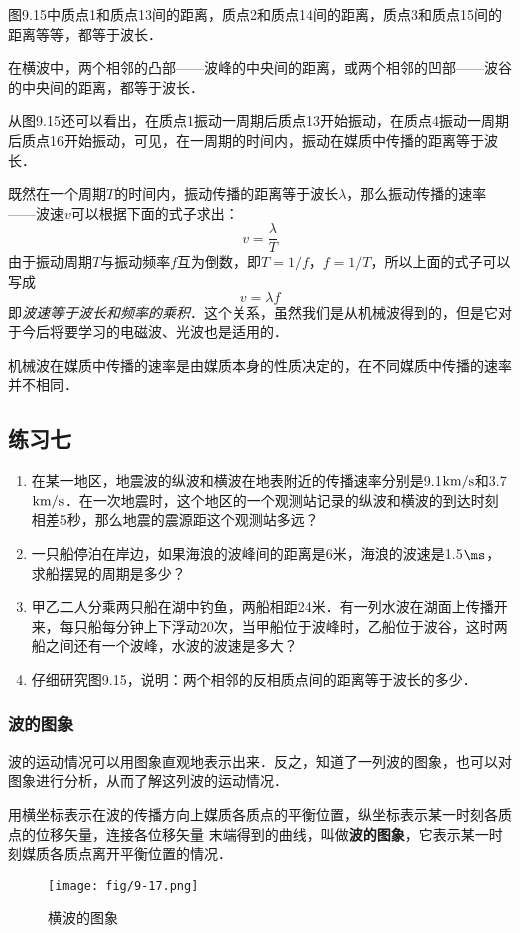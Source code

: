 图9.15中质点1和质点13间的距离，质点2和质点14间的距离，质点3和质点15间的距离等等，都等于波长．

在横波中，两个相邻的凸部——波峰的中央间的距离，或两个相邻的凹部——波谷的中央间的距离，都等于波长．

从图9.15还可以看出，在质点1振动一周期后质点13开始振动，在质点4振动一周期后质点16开始振动，可见，在一周期的时间内，振动在媒质中传播的距离等于波长．

既然在一个周期$T$的时间内，振动传播的距离等于波长$\lambda$，那么振动传播的速率——波速$v$可以根据下面的式子求出：
\[v=\frac{\lambda}{T}\]
由于振动周期$T$与振动频率$f$互为倒数，即$T=1/f$，$f=1/T$，所以上面的式子可以写成
\[v=\lambda f\]
即\textit{波速等于波长和频率的乘积}．这个关系，虽然我们是从机械波得到的，但是它对于今后将要学习的电磁波、光波也是适用的．

机械波在媒质中传播的速率是由媒质本身的性质决定的，在不同媒质中传播的速率并不相同．

\subsection*{练习七}
\begin{enumerate}
    \item 在某一地区，地震波的纵波和横波在地表附近的传播速率分别是9.1${\rm km}/{\rm s}$和3.7${\rm km}/{\rm s}$．在一次地震时，这个地区的一个观测站记录的纵波和横波的到达时刻相差5秒，那么地震的震源距这个观测站多远？
    \item 一只船停泊在岸边，如果海浪的波峰间的距离是6米，海浪的波速是1.5$\ms$，求船摆晃的周期是多少？
    \item 甲乙二人分乘两只船在湖中钓鱼，两船相距24米．有一列水波在湖面上传播开来，每只船每分钟上下浮动20次，当甲船位于波峰时，乙船位于波谷，这时两船之间还有一个波峰，水波的波速是多大？
    \item 仔细研究图9.15，说明：两个相邻的反相质点间的距离等于波长的多少．
\end{enumerate}

\subsubsection{波的图象}

波的运动情况可以用图象直观地表示出来．反之，知道了一列波的图象，也可以对图象进行分析，从而了解这列波的运动情况．

用横坐标表示在波的传播方向上媒质各质点的平衡位置，纵坐标表示某一时刻各质点的位移矢量，连接各位移矢量
末端得到的曲线，叫做\textbf{波的图象}，它表示某一时刻媒质各质点离开平衡位置的情况．
\begin{figure}[htp]\centering
    \texttt{[image: fig/9-17.png]}
    \caption{横波的图象}
    \end{figure}

